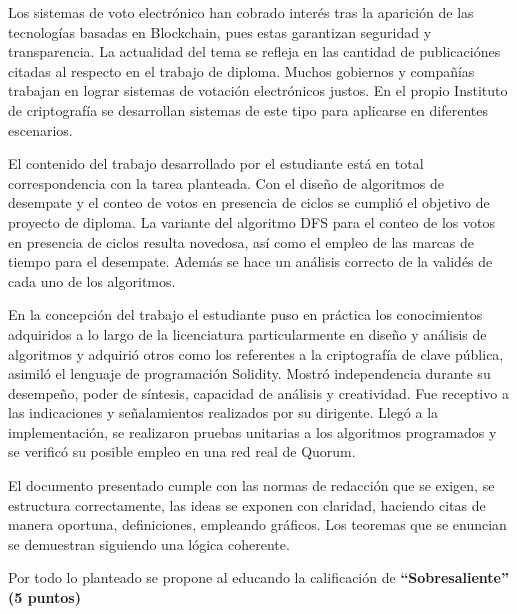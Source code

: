 \begin{opinion}
Los sistemas de voto electr\'onico han cobrado inter\'es tras la aparición de las tecnolog\'ias basadas en Blockchain, pues estas garantizan seguridad y transparencia. La actualidad del tema se refleja en las cantidad de publicaci\'ones citadas al respecto en el trabajo de diploma. Muchos gobiernos y compañ\'ias trabajan en lograr sistemas de votaci\'on electr\'onicos justos. En el propio Instituto de criptograf\'ia se desarrollan sistemas de este tipo para aplicarse en diferentes escenarios. 

El contenido del trabajo desarrollado por el estudiante está en total correspondencia con la tarea planteada. Con el diseño de algoritmos de desempate y el conteo de votos en presencia de ciclos se cumpli\'o el objetivo de proyecto de diploma. La variante del algoritmo DFS para el conteo de los votos en presencia de ciclos resulta novedosa, as\'i como el empleo de las marcas de tiempo para el desempate. Adem\'as se hace un an\'alisis correcto de la valid\'es de cada uno de los algoritmos.

En la concepción del trabajo el estudiante puso en práctica los conocimientos adquiridos a lo largo de la licenciatura particularmente en diseño y an\'alisis de algoritmos y adquirió otros como los referentes a la criptografía de clave pública, asimiló el lenguaje de programación Solidity. Mostró independencia durante su desempeño, poder de síntesis, capacidad de análisis y creatividad. Fue receptivo a las indicaciones y señalamientos realizados por su dirigente.  Lleg\'o a la implementaci\'on, se realizaron pruebas unitarias a los algoritmos programados y se verificó su posible empleo en una red real de Quorum. 

El documento presentado  cumple con las normas de redacci\'on que se exigen, se estructura correctamente, las ideas se exponen con claridad, haciendo citas de manera oportuna, definiciones, empleando gr\'aficos. Los teoremas que se enuncian se demuestran siguiendo una l\'ogica coherente.


Por todo lo planteado se propone al educando la calificación de \textbf{ “Sobresaliente” (5 puntos)} 
\end{opinion}